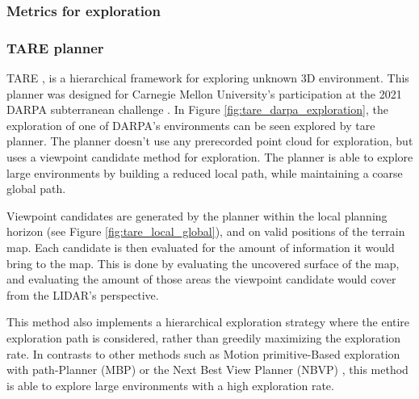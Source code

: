 \documentclass[12pt]{article}
\begin{document}
        \subsubsection{Metrics for exploration}
        \subsubsection{TARE planner}

        TARE \cite{tare}, is a hierarchical framework for exploring unknown 3D environment. This planner was designed for Carnegie Mellon University's participation at the 2021 DARPA subterranean challenge \cite{darpa_subterranean_challenge}. In Figure \ref{fig:tare_darpa_exploration}, the exploration of one of DARPA's environments  can be seen explored by tare planner. The planner doesn't use any prerecorded point cloud for exploration, but uses a viewpoint candidate method for exploration. The planner is able to explore large environments by building a reduced local path, while maintaining a coarse global path.

        Viewpoint candidates are generated by the planner within the local planning horizon (see Figure \ref{fig:tare_local_global}), and on valid positions of the terrain map. Each candidate is then evaluated for the amount of information it would bring to the map. This is done by evaluating the uncovered surface of the map, and evaluating the amount of those areas the viewpoint candidate would cover from the LIDAR's perspective.  

        This method also implements a hierarchical exploration strategy where the entire exploration path is considered, rather than greedily maximizing the exploration rate. In contrasts to other methods such as Motion primitive-Based exploration with path-Planner (MBP) \cite{dharmadhikari2020motion} or the Next Best View Planner (NBVP) \cite{bircher2016receding}, this method is able to explore large environments with a high exploration rate.
\end{document}
